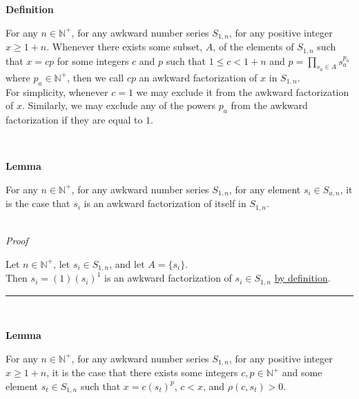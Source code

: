 \documentclass[a4paper,12pt]{article}
\begin{document}
\label{definition:awkward_factorization}
\hypertarget{definition:awkward_factorization}{}
\begin{tcolorbox}
\textbf{Definition}

For any $n \in \mathbb{N}^+$, for any awkward number series $S_{1,n}$, for any positive integer $x \geq 1 + n$. Whenever there exists some subset, $A$, of the elements of $S_{1,n}$ such that $x = cp$ for some integers $c$ and $p$ such that $1 \leq c < 1 + n$ and $p = \displaystyle \prod_{s_a \in A} s_a^{p_a}$ where $p_a \in \mathbb{N}^+$, then we call $cp$ an awkward factorization of $x$ in $S_{1, n}$.\\

\noindent For simplicity, whenever $c = 1$ we may exclude it from the awkward factorization of $x$. Similarly, we may exclude any of the powers $p_a$ from the awkward factorization if they are equal to $1$.

\end{tcolorbox}
\noindent \\






\label{lemma:awkward_factorization_of_element}
\hypertarget{lemma:awkward_factorization_of_element}{}
\begin{tcolorbox}
\textbf{Lemma}

For any $n \in \mathbb{N}^+$, for any awkward number series $S_{1,n}$, for any element $s_i \in S_{a, n}$, it is the case that $s_i$ is an awkward factorization of itself in $S_{1, n}$.
\end{tcolorbox}

\noindent \\
\textit{Proof}

\noindent Let $n \in \mathbb{N}^+$, let $s_i \in S_{1, n}$, and let $A = \{s_i\}$.\\

\noindent Then $s_i = (1)(s_i)^1$ is an awkward factorization of $s_i \in S_{1, n}$ \hyperlink{definition:awkward_factorization}{by definition}.


\begin{center}
\noindent\rule{8cm}{0.4pt}
\end{center}
\noindent \\




\label{lemma:non_common_factorization}
\hypertarget{lemma:non_common_factorization}{}
\begin{tcolorbox}
\textbf{Lemma}

For any $n \in \mathbb{N}^+$, for any awkward number series $S_{1,n}$, for any positive integer $x \geq 1 + n$, it is the case that there exists some integers $c, p \in \mathbb{N}^+$ and some element $s_t \in S_{1, n}$ such that $x = c(s_t)^p$, $c < x$, and $\rho(c, s_t) > 0$.

\end{tcolorbox}
\end{document}
